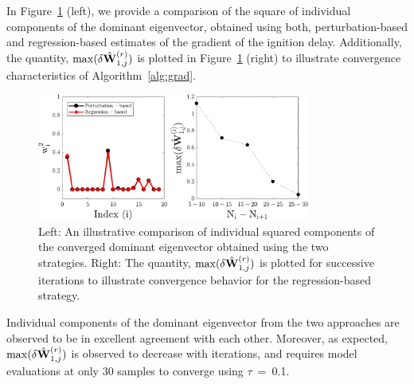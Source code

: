 %
In Figure~\ref{fig:comp} (left),
we provide a comparison of the square of individual components of the dominant eigenvector, obtained using both, perturbation-based and regression-based estimates of the gradient of the ignition 
delay. Additionally, the quantity, $\max(\delta \hat{\mathbf{{W}}}_{1,j}^{(r)})$ is plotted in
Figure~\ref{fig:comp} (right) to illustrate convergence characteristics of Algorithm~\ref{alg:grad}.
%
\begin{figure}[htbp]
 \begin{center}
  \includegraphics[width=0.8\textwidth]{./Figures/eigv6}
\caption{Left: An illustrative comparison of individual squared components of the converged dominant
eigenvector obtained using the two strategies. Right: The quantity,  $\max(\delta \hat{\mathbf{{W}}}_{1,j}^{(r)})$
is plotted for successive iterations to illustrate convergence behavior for the regression-based strategy.}
\label{fig:comp}
\end{center}
\end{figure}
%
Individual components of the dominant eigenvector from the two approaches are observed to be in excellent
agreement with each other. Moreover, as expected,  $\max(\delta \hat{\mathbf{{W}}}_{1,j}^{(r)})$ is observed 
to decrease with iterations, and requires model evaluations at only 30 samples to converge using $\tau$~=~0.1.

